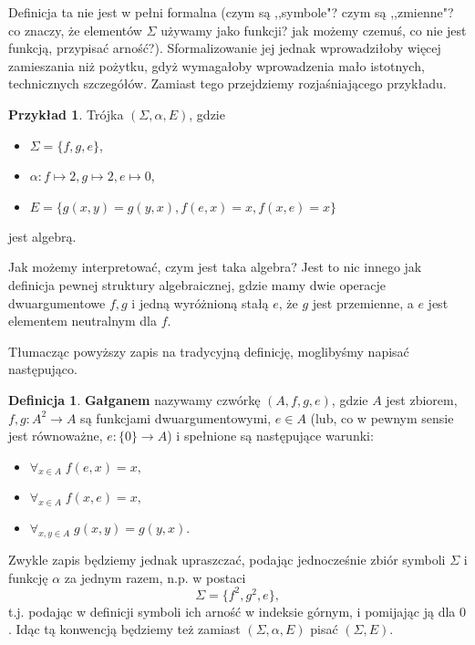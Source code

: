 \documentclass{article}
\theoremstyle{definition}
\newtheorem{definition}{Definicja}[section]
\newtheorem{example}{Przykład}[section]
\begin{document}
Definicja ta nie jest w pełni formalna (czym są ,,symbole"? czym są ,,zmienne"?
	co znaczy, że elementów $\Sigma$ używamy jako funkcji?
	jak możemy czemuś, co nie jest funkcją, przypisać arność?).
Sformalizowanie jej jednak wprowadziłoby więcej zamieszania niż pożytku,
	gdyż wymagałoby wprowadzenia mało istotnych, technicznych szczegółów.
Zamiast tego przejdziemy rozjaśniającego przykładu.

\begin{example}
	Trójka $(\Sigma, \alpha, E)$, gdzie
	\begin{itemize}
		\item $\Sigma = \{f, g, e\}$,
		\item $\alpha: f \mapsto 2, g \mapsto 2, e \mapsto 0$,
		\item $E = \{g(x, y) = g(y, x), f(e, x) = x, f(x, e) = x\}$
	\end{itemize}
	jest algebrą.
\end{example}
Jak możemy interpretować, czym jest taka algebra?
Jest to nic innego jak definicja pewnej struktury algebraicznej,
gdzie mamy dwie operacje dwuargumentowe $f, g$ i jedną wyróżnioną stałą $e$,
że $g$ jest przemienne, a $e$ jest elementem neutralnym dla $f$.

Tłumacząc powyższy zapis na tradycyjną definicję, moglibyśmy napisać następująco.
\begin{definition}
	\textbf{Gałganem} nazywamy czwórkę $(A, f, g, e)$,
		gdzie $A$ jest zbiorem,
		$f, g: A^2 \to A$ są funkcjami dwuargumentowymi,
		$e \in A$ (lub, co w pewnym sensie jest równoważne, $e: \{0\} \to A$)
		i spełnione są następujące warunki:
	\begin{itemize}
		\item $\forall_{x\in A}\; f(e, x) = x,$
		\item $\forall_{x\in A}\; f(x, e) = x,$
		\item $\forall_{x,y\in A}\; g(x, y) = g(y, x).$
	\end{itemize}
\end{definition}

Zwykle zapis będziemy jednak upraszczać,
	podając jednocześnie zbiór symboli $\Sigma$ i funkcję $\alpha$ za jednym razem,
	n.p. w postaci
\begin{equation}
	\Sigma = \{f^2, g^2, e\},
\end{equation}
t.j. podając w definicji symboli ich arność w indeksie górnym, i pomijając ją dla $0$.
Idąc tą konwencją będziemy też zamiast $(\Sigma, \alpha, E)$ pisać $(\Sigma, E)$.
\end{document}
